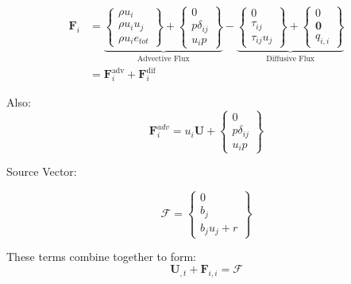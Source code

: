 \documentclass[11pt, letterpaper, twoside]{article}
\newcommand{\etot}{e_{tot}}
\renewcommand{\vec}[1]{\bm{#1}}
\newcommand{\U}{\vec{U}}
\newcommand{\F}{\vec{F}}
\newcommand{\src}{\vec{\mathscr{F}}}
\begin{document}
    \begin{equation}
        \begin{split}
        \F_i & = 
        \underbrace{
        \begin{Bmatrix}
            \rho u_i \\
            \rho u_i u_j \\
            \rho u_i \etot
        \end{Bmatrix}
        + \begin{Bmatrix}
            0 \\
            p \delta_{ij}\\
            u_i p
        \end{Bmatrix} }_{\text{Advective Flux}}
        - \underbrace{ \begin{Bmatrix}
            0 \\
            \tau_{ij}\\
            \tau_{ij} u_j 
        \end{Bmatrix}
        + \begin{Bmatrix}
            0 \\
            \vec{0} \\
            q_{i,i}
        \end{Bmatrix} }_{\text{Diffusive Flux}} \\
        & = \F_i^{\text{adv}} + \F_i^{\text{dif}}
        \end{split}
    \end{equation}

    Also:
    \begin{equation}
        \F_i^{adv}  = 
        u_i \U
        + \begin{Bmatrix}
            0 \\
            p \delta_{ij}\\
            u_i p
        \end{Bmatrix} 
    \end{equation}

    Source Vector:

    \begin{equation}
        \src = 
        \begin{Bmatrix}
            0 \\
            b_j \\
            b_j u_j + r
        \end{Bmatrix}
    \end{equation}

    These terms combine together to form:
    \begin{equation} \label{eq:vecNS}
        \U_{,t} + \F_{i,i} = \src
    \end{equation}
\end{document}
